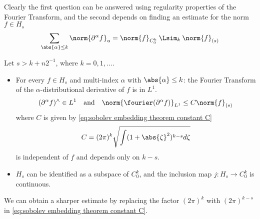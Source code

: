 \documentclass[../main-v2-manifolds.tex]{subfiles}
\begin{document}
Clearly the first question can be answered using regularity properties of the Fourier Transform, and the second depends on finding an estimate for the norm $f\in H_s$
\[
\sum_{\abs{\alpha}\leq k} \norm{\partial^{\alpha} f}_u= \norm{f}_{C_0^k}\: \Lsim_{k}\: \norm{f}_{(s)}
\]
\begin{wts}\label{thm:Sobolev Embedding Theorem}
Let $s > k + n2^{-1}$, where $k = 0, 1,\ldots$.
\begin{itemize}
    \item For every $f\in H_s$ and multi-index $\alpha$ with $\abs{\alpha}\leq k$: the Fourier Transform of the $\alpha$-distributional derivative of $f$ is in $L^1$.
    \[
    (\partial^\alpha f)^{\wedge}\in L^1\quad\text{and}\quad \norm{\fourier(\partial^\alpha f)}_{L^1}\leq C\norm{f}_{(s)}
    \]
    where $C$ is given by \cref{eq:sobolev embedding theorem constant C}
    \begin{equation}
        C=(2\pi)^k\sqrt{\int (1+\abs{\zeta}^2)^{k-s}d\zeta}
        \label{eq:sobolev embedding theorem constant C}
    \end{equation}
    is independent of $f$ and depends only on $k-s$. 
    \item $H_s$ can be identified as a subspace of $C_0^k$, and the inclusion map $j: H_s\to C_0^k$ is continuous.
\end{itemize}
\end{wts}
\begin{remark}\label{rmk:sobolev embedding theorem sharper constant C}
    We can obtain a sharper estimate by replacing the factor $(2\pi)^k$ with $(2\pi)^{k-s}$ in \cref{eq:sobolev embedding theorem constant C}.
\end{remark}
\end{document}
